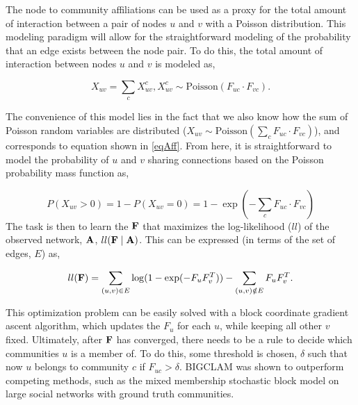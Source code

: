The node to community affiliations can be used as a proxy for the total amount of interaction between a pair of nodes $u$ and $v$ with a Poisson distribution. This modeling paradigm will allow for the straightforward modeling of the probability that an edge exists between the node pair. To do this, the total amount of interaction between nodes $u$ and $v$ is modeled as,

\begin{equation}
X_{uv}=\sum_{c}X_{uv}^{c}, X_{uv}^{c} \sim \text{Poisson}(F_{uc}\cdot F_{vc}).
\end{equation}

The convenience of this model lies in the fact that we also know how the sum of Poisson random variables are distributed ($X_{uv} \sim \text{Poisson}(\sum_{c}F_{uc}\cdot F_{vc})$), and corresponds to equation shown in \ref{eqAff}. From here, it is straightforward to model the probability of $u$ and $v$ sharing connections based on the Poisson probability mass function as,

\begin{equation}
P(X_{uv}>0)=1-P(X_{uv}=0)=1-\exp(-\sum_{c}F_{uc}\cdot F_{vc})
\end{equation}
The task is then to learn the ${\bf F}$ that maximizes the log-likelihood ($ll$) of the observed network, ${\bf A}$, $ll({\bf F} \mid {\bf A})$. This can be expressed (in terms of the set of edges, $E$) as,

\begin{equation}
ll({\bf F})=\sum_{(u,v) \in E} \log(1-\exp(-F_{u}F_{v}^{T}))- \sum_{(u,v) \notin E} F_{u}F_{v}^{T}.
\end{equation}

This optimization problem can be easily solved with a block coordinate gradient ascent algorithm, which updates the $F_{u}$ for each $u$, while keeping all other $v$ fixed. Ultimately, after ${\bf F}$ has converged, there needs to be a rule to decide which communities $u$ is a member of. To do this, some threshold is chosen, $\delta$ such that now $u$ belongs to community $c$ if $F_{uc}>\delta$. BIGCLAM was shown to outperform competing methods, such as the mixed membership stochastic block model on large social networks with ground truth communities. 


